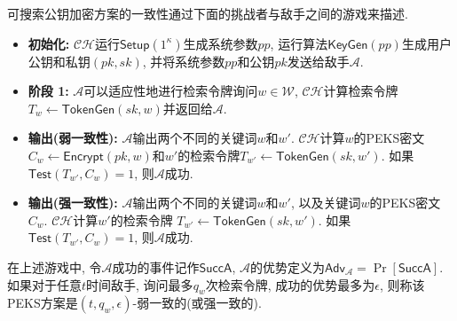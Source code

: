 \begin{definition}[一致性]
可搜索公钥加密方案的一致性通过下面的挑战者与敌手之间的游戏来描述.
\begin{itemize}
	\item \textbf{初始化:} $\mathcal{CH}$运行$\mathsf{Setup}(1^\kappa)$生成系统参数$pp$, 运行算法$\mathsf{KeyGen}(pp)$生成用户公钥和私钥$(pk, sk)$, 并将系统参数$pp$和公钥$pk$发送给敌手$\mathcal{A}$. 

	\item \textbf{阶段 1:} $\mathcal{A}$可以适应性地进行检索令牌询问$w \in \mathcal{W}$, $\mathcal{CH}$计算检索令牌$T_w \leftarrow \mathsf{TokenGen}(sk, w)$并返回给$\mathcal{A}$.

	\item \textbf{输出(弱一致性):} $\mathcal{A}$输出两个不同的关键词$w$和$w'$. $\mathcal{CH}$计算$w$的PEKS密文$C_w \leftarrow \mathsf{Encrypt}(pk, w)$和$w'$的检索令牌$T_{w'} \leftarrow \mathsf{TokenGen}(sk, w')$. 如果$\mathsf{Test}(T_{w'}, C_w) = 1$, 则$\mathcal{A}$成功.

	\item \textbf{输出(强一致性):} $\mathcal{A}$输出两个不同的关键词$w$和$w'$, 以及关键词$w$的PEKS密文$C_w$. $\mathcal{CH}$计算$w'$的检索令牌 $T_{w'} \leftarrow \mathsf{TokenGen}(sk, w')$. 如果$\mathsf{Test}(T_{w'}, C_w) = 1$, 则$\mathcal{A}$成功.
\end{itemize}

在上述游戏中, 令$\mathcal{A}$成功的事件记作$\mathsf{SuccA}$, $\mathcal{A}$的优势定义为$\mathsf{Adv}_\mathcal{A} = \Pr[\mathsf{SuccA}]$. 如果对于任意$t$时间敌手, 询问最多$q_w$次检索令牌, 成功的优势最多为$\epsilon$, 则称该PEKS方案是$(t, q_w, \epsilon)$-弱一致的(或强一致的).
\end{definition}

